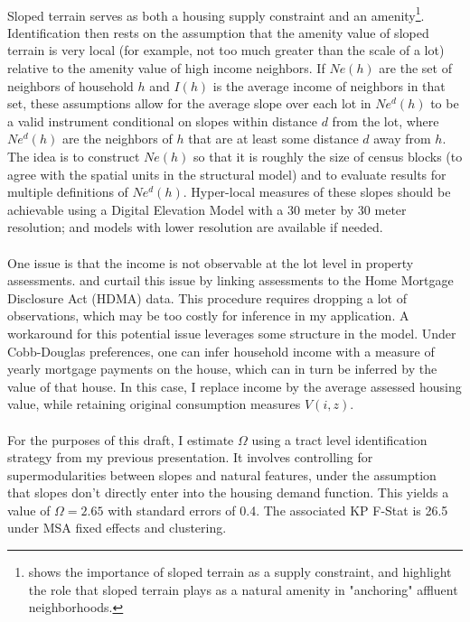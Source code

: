 \documentclass[]{article}
\begin{document}
\paragraph*{}
Sloped terrain serves as both a housing supply constraint and an amenity\footnote{\cite{saiz2010} shows the importance of sloped terrain as a supply constraint, and \cite{LeeandLin} highlight the role that sloped terrain plays as a natural amenity in "anchoring" affluent neighborhoods.}.  Identification then rests on the assumption that the amenity value of sloped terrain is very local (for example, not too much greater than the scale of a lot) relative to the amenity value of high income neighbors. If $Ne(h)$ are the set of neighbors of household $h$ and $I(h)$ is the average income of neighbors in that set, these assumptions allow for the average slope over each lot in $Ne^{d}(h)$ to be a valid instrument conditional on slopes within distance $d$ from the lot, where $Ne^{d}(h)$ are the neighbors of $h$ that are at least some distance $d$ away from $h$. The idea is to construct $Ne(h)$ so that it is roughly the size of census blocks (to agree with the spatial units in the structural model) and to evaluate results for multiple definitions of $Ne^{d}(h)$. Hyper-local measures of these slopes should be achievable using a Digital Elevation Model with a $30$ meter by $30$ meter resolution; and models with lower resolution are available if needed. 
\paragraph*{}
One issue is that the income is not observable at the lot level in property assessments. \cite{kulka} and \cite{Song} curtail this issue by linking assessments to the Home Mortgage Disclosure Act (HDMA) data. This procedure requires dropping a lot of observations, which may be too costly for inference in my application. A workaround for this potential issue leverages some structure in the model. Under Cobb-Douglas preferences, one can infer household income with a measure of yearly mortgage payments on the house, which can in turn be inferred by the value of that house. In this case, I replace income by the average assessed housing value, while retaining original consumption measures $V(i, z)$. 

\paragraph*{} 
 For the purposes of this draft, I estimate $\Omega$ using a tract level identification strategy from my previous presentation. It involves controlling for supermodularities between slopes and natural features, under the assumption that slopes don't directly enter into the housing demand function. This yields a value of $\Omega = 2.65$ with standard errors of 0.4. The associated KP F-Stat is 26.5 under MSA fixed effects and clustering. 
 
\end{document}
